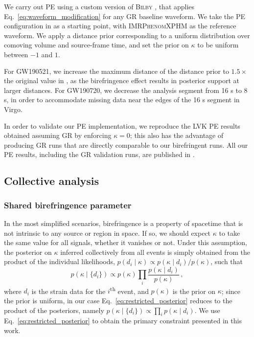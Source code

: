 \documentclass[aps,prd,twocolumn,superscriptaddress,preprintnumbers,floatfix,nofootinbib]{revtex4-2}
\begin{document}
We carry out \ac{PE} using a custom version of \textsc{Bilby} \citep{Bilby}, that applies Eq.~\eqref{eq:waveform_modification} for any \ac{GR} baseline waveform.
We take the \ac{PE} configuration in \citep{GWTC-2.1, GWTC-3, GWTC-2.1_dataset, GWTC-3_dataset} as a starting point, with \textsc{IMRPhenomXPHM} \citep{Pratten:2020ceb} as the reference waveform.
We apply a distance prior corresponding to a uniform distribution over comoving volume and source-frame time, and set the prior on $\kappa$ to be uniform between $-1$ and $1$. 

For GW190521, we increase the maximum distance of the distance prior to $1.5\times$ the original value in \cite{GWTC-2.1_dataset}, as the birefringence effect results in posterior support at larger distances.
For GW190720, we decrease the analysis segment from 16 s to 8 s, in order to accommodate missing data near the edges of the 16 s segment in Virgo.

In order to validate our \ac{PE} implementation, we reproduce the \ac{LVK} \ac{PE} results obtained assuming \ac{GR} by enforcing $\kappa = 0$; this also has the advantage of producing \ac{GR} runs that are directly comparable to our birefringent runs.
All our \ac{PE} results, including the \ac{GR} validation runs, are published in \citet{dataset}.

\subsection{Collective analysis}

\subsubsection{Shared birefringence parameter}

In the most simplified scenarios, birefringence is a property of spacetime that is not intrinsic to any source or region in space. 
If so, we should expect $\kappa$ to take the same value for all signals, whether it vanishes or not.
Under this assumption, the posterior on $\kappa$ inferred collectively from all events is simply obtained from the product of the individual likelihoods, $p(d_i \mid\kappa) \propto p(\kappa \mid d_i)/p(\kappa)$, such that
\begin{equation}
    p(\kappa \mid \{d_i\})\propto p(\kappa) \prod_{i}\frac{p(\kappa \mid d_i)}{p(\kappa)}\,,
    \label{eq:restricted_posterior}
\end{equation}
where $d_i$ is the strain data for the $i$\textsuperscript{th} event, and $p(\kappa)$ is the prior on $\kappa$; since the prior is uniform, in our case Eq.~\eqref{eq:restricted_posterior} reduces to the product of the posteriors, namely $p(\kappa \mid \{d_i\}) \propto \prod_{i}p(\kappa \mid d_i)$.
We use Eq.~\eqref{eq:restricted_posterior} to obtain the primary constraint presented in this work.
\end{document}

